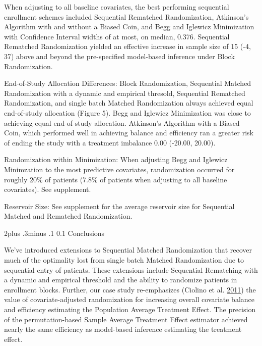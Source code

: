 \documentclass[12pt,oneside]{book}
\makeatletter
\newlength{\li}\setlength{\li}{14.48pt}
\newlength{\di}\setlength{\di}{-3.5mm}
\renewcommand\section{ \@startsection {section}{1}{\z@}%
    {2\@bls  plus .3\@bls minus .1\@bls}%
    {0.1\@bls}%
    {\centering\normalfont}}
\theoremstyle{definition}
\theoremstyle{definition}
\theoremstyle{definition}
\theoremstyle{remark}
\makeatother
\begin{document}
When adjusting to all baseline covariates, the best performing
sequential enrollment schemes included Sequential Rematched
Randomization, Atkinson's Algorithm with and without a Biased Coin, and
Begg and Iglewicz Minimization with Confidence Interval widths of at
most, on median, 0.376. Sequential Rematched Randomization yielded an
effective increase in sample size of 15 (-4, 37) above and beyond the
pre-specified model-based inference under Block Randomization.

End-of-Study Allocation Differences: Block Randomization, Sequential
Matched Randomization with a dynamic and empirical thresold, Sequential
Rematched Randomization, and single batch Matched Randomization always
achieved equal end-of-study allocation (Figure 5). Begg and Iglewicz
Minimization was close to achieving equal end-of-study allocation.
Atkinson's Algorithm with a Biased Coin, which performed well in
achieving balance and efficiency ran a greater risk of ending the study
with a treatment imbalance 0.00 (-20.00, 20.00).

Randomization within Minimization: When adjusting Begg and Iglewicz
Minimzation to the most predictive covariates, randomization occurred
for roughly 20\% of patients (7.8\% of patients when adjusting to all
baseline covariates). See supplement.

Reservoir Size: See supplement for the average reservoir size for
Sequential Matched and Rematched Randomization.

\hypertarget{conclusions}{%
\section{Conclusions}\label{conclusions}}

We've introduced extensions to Sequential Matched Randomization that
recover much of the optimality lost from single batch Matched
Randomization due to sequential entry of patients. These extensions
include Sequential Rematching with a dynamic and empirical threshold and
the ability to randomize patients in enrollment blocks. Further, our
case study re-emphasizes (Ciolino et al.
\protect\hyperlink{ref-Ciolino:2011ff}{2011}) the value of
covariate-adjusted randomization for increasing overall covariate
balance and efficiency estimating the Population Average Treatment
Effect. The precision of the permutation-based Sample Average Treatment
Effect estimator achieved nearly the same efficiency as model-based
inference estimating the treatment effect.
\end{document}
